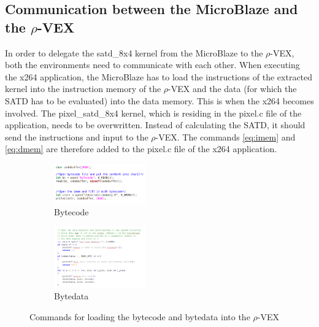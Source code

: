 \subsection{Communication between the MicroBlaze and the $\rho$-VEX}

In order to delegate the satd\_8x4 kernel from the MicroBlaze to the $\rho$-VEX, both the environments need to communicate with each other. When executing the x264 application, the MicroBlaze has to load the instructions of the extracted kernel into the instruction memory of the $\rho$-VEX and the data (for which the SATD has to be evaluated) into the data memory. This is when the x264 becomes involved. The pixel\_satd\_8x4 kernel, which is residing in the pixel.c file of the application, needs to be overwritten. Instead of calculating the SATD, it should send the instructions and input to the $\rho$-VEX. The commands \ref{eq:imem} and \ref{eq:dmem} are therefore added to the pixel.c file of the x264 application.

\begin{figure}
	\centering
	\begin{subfigure} [h] {0.3\textwidth}
		\centering
		\includegraphics[width=150px]{Pictures/imem}
		\caption{Bytecode}
		\label{fig:imem}
	\end{subfigure}
	\quad
	\begin{subfigure} [h] {0.3\textwidth}
		\centering
		\includegraphics[width=150px]{Pictures/dmem}
		\caption{Bytedata}
		\label{fig:schottky2}
	\end{subfigure}
	\quad
\caption{Commands for loading the bytecode and bytedata into the $\rho$-VEX}%
\label{}%
\end{figure}